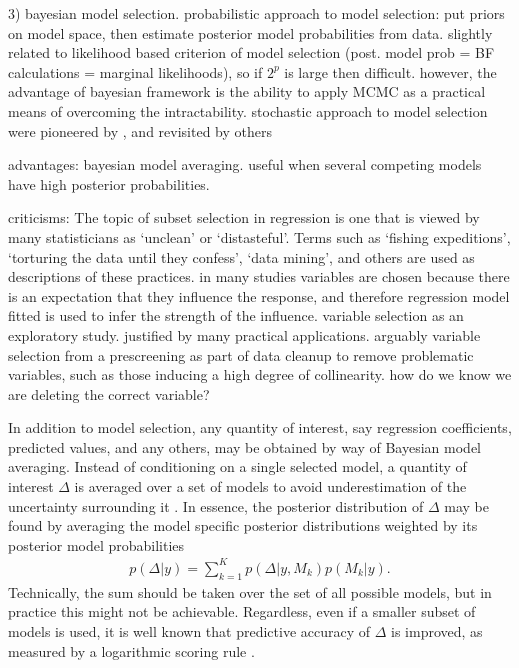 \documentclass[a4paper,showframe,11pt]{report}
\begin{document}
3) bayesian model selection. probabilistic approach to model selection: put priors on model space, then estimate posterior model probabilities from data. slightly related to likelihood based criterion of model selection (post. model prob = BF calculations = marginal likelihoods), so if $2^p$ is large then difficult. however, the advantage of bayesian framework is the ability to apply MCMC as a practical means of overcoming the intractability. stochastic approach to model selection were pioneered by \citep{George1993}, and revisited by others \citep{Kuo1998,dellaportas2002bayesian,Ntzoufras2008}

advantages: bayesian model averaging. useful when several competing models have high posterior probabilities.

criticisms: The topic of subset selection in regression is one that is viewed by many statisticians as ‘unclean’ or ‘distasteful’. Terms such as ‘fishing expeditions’, ‘torturing the data until they confess’, ‘data mining’, and others are used as descriptions of these practices. \citep{miller2002subset}
in many studies variables are chosen because there is an expectation that they influence the response, and therefore regression model fitted is used to infer the strength of the influence.
variable selection as an exploratory study. justified by many practical applications.
arguably variable selection from a prescreening as part of data cleanup to remove problematic variables, such as those inducing a high degree of collinearity. how do we know we are deleting the correct variable?

In addition to model selection, any quantity of interest, say regression coefficients, predicted values, and any others, may be obtained by way of Bayesian model averaging.
Instead of conditioning on a single selected model, a quantity of interest $\Delta$ is averaged over a set of models to avoid underestimation of the uncertainty surrounding it \citep{madigan1994model}.
In essence, the posterior distribution of $\Delta$ may be found by averaging the model specific posterior distributions weighted by its posterior model probabilities
\begin{align}\label{eq:bma}
  p(\Delta|y) = \sum_{k=1}^K p(\Delta|y,M_k)p(M_k|y).
\end{align}
Technically, the sum should be taken over the set of all possible models, but in practice this might not be achievable.
Regardless, even if a smaller subset of models is used, it is well known that predictive accuracy of $\Delta$ is improved, as measured by a logarithmic scoring rule \citep{raftery1997bayesian}.
\end{document}
